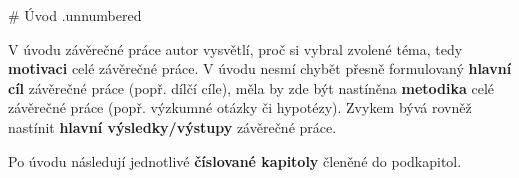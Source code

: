 # Úvod {.unnumbered}


V úvodu závěrečné práce autor vysvětlí, proč si vybral zvolené téma, tedy \textbf{motivaci} celé závěrečné práce. V úvodu nesmí chybět přesně formulovaný \textbf{hlavní cíl} závěrečné práce (popř. dílčí cíle), měla by zde být nastíněna \textbf{metodika} celé závěrečné práce (popř. výzkumné otázky či hypotézy). Zvykem bývá rovněž nastínit \textbf{hlavní výsledky/výstupy} závěrečné práce. 

Po úvodu následují jednotlivé \textbf{číslované kapitoly} členěné do podkapitol.
